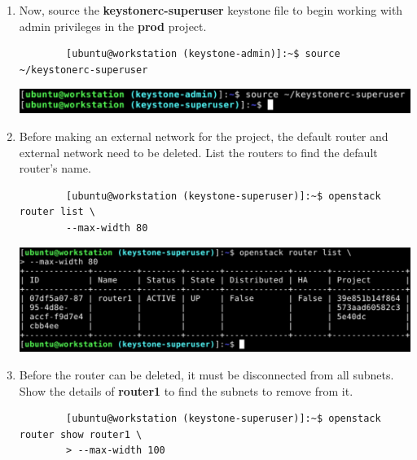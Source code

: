 \documentclass[letterpaper, 12pt]{article}
\begin{document}
\begin{enumerate}
    \item Now, source the \textbf{keystonerc-superuser} keystone file to begin working with admin privileges in the \textbf{prod} project.
    \begin{lstlisting}
        [ubuntu@workstation (keystone-admin)]:~$ source ~/keystonerc-superuser
    \end{lstlisting}

    \begin{center}
        \includegraphics[width=\linewidth]{images/part1/step13.png}
    \end{center}

    \item Before making an external network for the project, the default router and external network need to be deleted.
    List the routers to find the default router's name.
    \begin{lstlisting}
        [ubuntu@workstation (keystone-superuser)]:~$ openstack router list \
        --max-width 80
    \end{lstlisting}

    \begin{center}
        \includegraphics[width=\linewidth]{images/part1/step14.png}
    \end{center}

    \item Before the router can be deleted, it must be disconnected from all subnets.
    Show the details of \textbf{router1} to find the subnets to remove from it.

    \begin{lstlisting}
        [ubuntu@workstation (keystone-superuser)]:~$ openstack router show router1 \
        > --max-width 100
    \end{lstlisting}


\end{enumerate}
\end{document}
